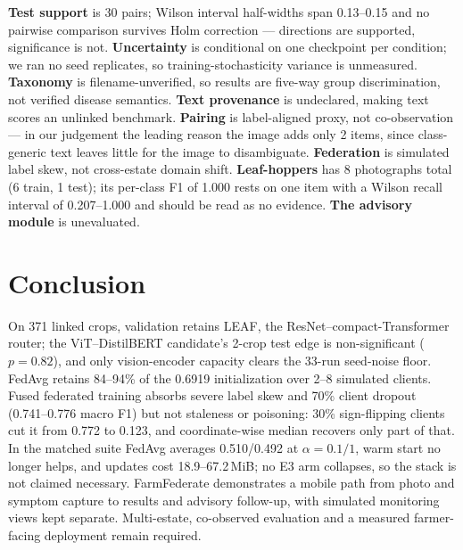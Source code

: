 \documentclass[conference]{IEEEtran}
\begin{document}
\textbf{Test support} is 30 pairs; Wilson interval half-widths span 0.13--0.15 and no
pairwise comparison survives Holm correction --- directions are supported,
significance is not. \textbf{Uncertainty} is conditional on one checkpoint per
condition; we ran no seed replicates, so training-stochasticity variance is
unmeasured. \textbf{Taxonomy} is filename-unverified, so results are five-way
group discrimination, not verified disease semantics. \textbf{Text provenance} is
undeclared, making text scores an unlinked benchmark. \textbf{Pairing} is
label-aligned proxy, not co-observation --- in our judgement the leading reason the
image adds only 2 items, since class-generic text leaves little for the image to
disambiguate. \textbf{Federation} is simulated label skew, not cross-estate domain
shift. \textbf{Leaf-hoppers} has 8 photographs total (6 train, 1 test); its
per-class F1 of 1.000 rests on one item with a Wilson recall interval of
0.207--1.000 and should be read as no evidence. \textbf{The advisory module} is
unevaluated.

\fi
\section{Conclusion}
\label{sec:conc}

On 371 linked crops, validation retains LEAF, the ResNet--compact-Transformer
router; the ViT--DistilBERT candidate's 2-crop test edge is non-significant
($p=0.82$), and only vision-encoder capacity clears the 33-run seed-noise
floor. FedAvg retains 84--94\% of the 0.6919 initialization over 2--8 simulated
clients. Fused federated training absorbs severe label skew and 70\% client
dropout (0.741--0.776 macro F1) but not staleness or poisoning: 30\%
sign-flipping clients cut it from 0.772 to 0.123, and coordinate-wise median
recovers only part of that. In the matched suite FedAvg averages 0.510/0.492
at $\alpha=0.1/1$, warm start no longer helps, and updates cost
18.9--67.2\,MiB; no E3 arm collapses, so the stack is not claimed necessary.
FarmFederate demonstrates a mobile path from photo and symptom capture to
results and advisory follow-up, with simulated monitoring views kept separate.
Multi-estate, co-observed evaluation and a measured farmer-facing deployment
remain required.
\end{document}
